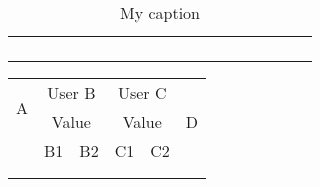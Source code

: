 \documentclass{book}
\begin{document}
	
	\begin{table}[]
		\centering
		\caption{My caption}
		\label{my-label}
		\begin{tabular}{|c|c|c|c|c|c|c|c|c|c|c|c|c|c|c|c|c|c|c|}
			\hline
			\multirow{3}{*}{} & 
			\multicolumn{2}{c|}{\multirow{2}{*}{}} & 
			\multicolumn{4}{c|}{}  & 
			\multicolumn{4}{c|}{}  & 
			\multicolumn{4}{c|}{}  & 
			\multicolumn{4}{c|}{}                         
			\\ \cline{4-19} & 
			 \multicolumn{2}{c|}{} &                
			 \multicolumn{2}{c|}{} & 
			 \multicolumn{2}{c|}{} & 
			 \multicolumn{2}{c|}{} & 
			 \multicolumn{2}{c|}{} & 
			 \multicolumn{2}{c|}{} & 
			 \multicolumn{2}{c|}{} & 
			 \multicolumn{2}{c|}{} & 
			 \multicolumn{2}{c|}{} 
			 \\ \cline{2-19} 
			&                    &                   &           &           &           &           &           &           &           &           &           &           &           &           &           &           &           &           \\ \hline
			&                    &                   &           &           &           &           &           &           &           &           &           &           &           &           &           &           &           &           \\ \hline
		\end{tabular}
	\end{table}
		
		
		
		\begin{table}
		\begin{tabular}{|c|c|c|c|c|c|} 
			\hline
			\multirow{2}{*}{A} & %
			\multicolumn{2}{c|}{User B} & %
			\multicolumn{2}{c|}{User C} & \multirow{3}{*}{D}\\
			\cline{2-5}
			& \multicolumn{2}{c|}{Value} & \multicolumn{2}{c|}{Value} & \\
			\cline{2-5}
			& B1 & B2 & C1 & C2 & \\
			\hline
			& & & & & \\
			\hline
			& & & & & \\
			\hline
		\end{tabular}
		\end{table}
		
		
		
\end{document}
